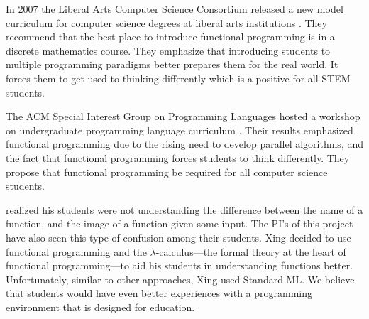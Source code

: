 In 2007 the Liberal Arts Computer Science Consortium released a new
model curriculum for computer science degrees at liberal arts
institutions \citep{LiberalArtsComputerScienceConsortium:2007}.  They
recommend that the best place to introduce functional programming is
in a discrete mathematics course.  They emphasize that introducing
students to multiple programming paradigms better prepares them for
the real world.  It forces them to get used to thinking differently
which is a positive for all STEM students.

The ACM Special Interest Group on Programming Languages hosted a
workshop on undergraduate programming language curriculum
\citep{Allen:2008}.  Their results emphasized functional programming
due to the rising need to develop parallel algorithms, and the fact
that functional programming forces students to think differently.
They propose that functional programming be required for all computer
science students.

\citet{Xing:2008} realized his students were not
understanding the difference between the name of a function, and the
image of a function given some input.  The PI's of this project have
also seen this type of confusion among their students.  Xing decided
to use functional programming and the $\lambda$-calculus---the formal
theory at the heart of functional programming---to aid his students in
understanding functions better. Unfortunately, similar to other
approaches, Xing used Standard ML.  We believe that students would
have even better experiences with a programming environment that is
designed for education.

